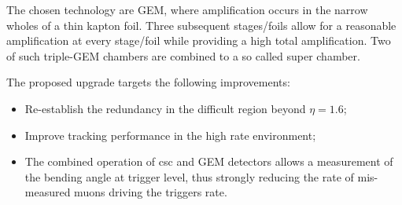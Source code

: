The chosen technology are GEM, where amplification occurs in the narrow wholes of a thin kapton foil. Three subsequent stages/foils allow for a reasonable amplification at every stage/foil while providing a high total amplification. Two of such triple-GEM chambers are combined to a so called super chamber.

The proposed upgrade targets the following improvements:
	\begin{itemize}
		\item Re-establish the redundancy in the difficult region beyond $\eta = 1.6 $;
		\item Improve tracking performance in the high rate environment;
		\item The combined operation of {csc} and GEM detectors allows a measurement of the bending angle at trigger level, thus strongly reducing the rate of mis-measured muons driving the triggers rate.

	\end{itemize}

